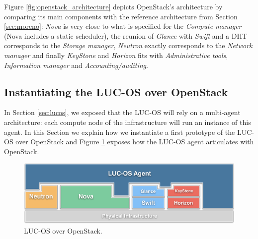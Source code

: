 


Figure \ref{fig:openstack_architecture} depicts OpenStack's architecture by 
comparing its main components with the reference architecture from Section 
\ref{sec:moreno}: \emph{Nova} is very close to what is specified for the 
\emph{Compute manager} (Nova includes a static scheduler), the reunion of 
\emph{Glance} with \emph{Swift} and a DHT corresponds to the \emph{Storage 	
manager}, \emph{Neutron} exactly corresponds to the \emph{Network manager} and 
finally \emph{KeyStone} and \emph{Horizon} fits with 
\emph{Administrative tools}, \emph{Information manager} and 
\emph{Accounting/auditing}.

\subsection{Instantiating the LUC-OS over OpenStack}
\label{sub:sec:revisiting_openstack}


In Section \ref{sec:lucos}, we exposed that the LUC-OS will rely on a 
multi-agent architecture: each compute node of the infrastructure will run an
instance of this agent. In this Section we explain how we instantiate a first
prototype of the LUC-OS over OpenStack and Figure \ref{fig:luc_os_over_os} 
exposes how the LUC-OS agent articulates with OpenStack.

\begin{figure}
	\centerline{
	 \includegraphics[width=0.95\linewidth]{Figures/lucos_over_openstack.pdf}
  }
	\caption{LUC-OS over OpenStack.}%
	\label{fig:luc_os_over_os}%
\end{figure}


